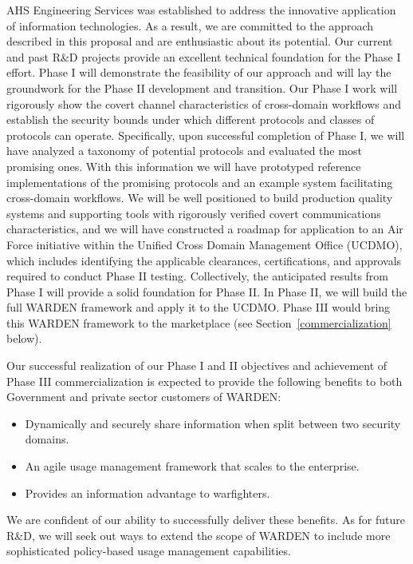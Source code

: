 \documentclass{sbir}
\begin{document}
AHS Engineering Services was established to address the innovative application of information technologies. As a result, we are committed to the approach described in this proposal and are enthusiastic about its potential. Our current and past R\&D projects provide an excellent technical foundation for the Phase I effort. Phase I will demonstrate the feasibility of our approach and will lay the groundwork for the Phase II development and transition. Our Phase I work will rigorously show the covert channel characteristics of cross-domain workflows and establish the security bounds under which different protocols and classes of protocols can operate. Specifically, upon successful completion of Phase I, we will have analyzed a taxonomy of potential protocols and evaluated the most promising ones. With this information we will have prototyped reference implementations of the promising protocols and an example system facilitating cross-domain workflows. We will be well positioned to build production quality systems and supporting tools with rigorously verified covert communications characteristics, and we will have constructed a roadmap for application to an Air Force initiative within the Unified Cross Domain Management Office (UCDMO), which includes identifying the applicable clearances, certifications, and approvals required to conduct Phase II testing. Collectively, the anticipated results from Phase I will provide a solid foundation for Phase II. In Phase II, we will build the full WARDEN framework and apply it to the UCDMO. Phase III would bring this WARDEN framework to the marketplace (see Section~\ref{commercialization} below).

Our successful realization of our Phase I and II objectives and achievement of Phase III commercialization is expected to provide the following benefits to both Government and private sector customers of WARDEN:
\vspace{-0.1in}
\begin{itemize}
     \item Dynamically and securely share information when split between two security domains.
     \item An agile usage management framework that scales to the enterprise.
     \item Provides an information advantage to warfighters.
\end{itemize}

We are confident of our ability to successfully deliver these benefits. As for future R\&D, we will seek out ways to extend the scope of WARDEN to include more sophisticated policy-based usage management capabilities.
\end{document}
